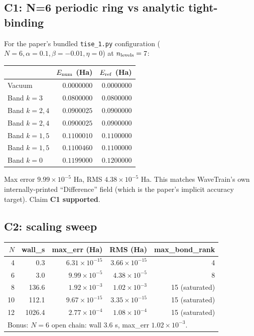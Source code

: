 \documentclass[11pt]{article}
\begin{document}
\subsection{C1: N=6 periodic ring vs analytic tight-binding}
For the paper's bundled \texttt{tise\_1.py} configuration
($N{=}6, \alpha{=}0.1, \beta{=}-0.01, \eta{=}0$) at $n_{\rm levels}=7$:
\begin{center}
\small
\begin{tabular}{l r r}
\toprule
& $E_{\rm num}$ (Ha) & $E_{\rm ref}$ (Ha) \\
\midrule
Vacuum   & $0.0000000$ & $0.0000000$ \\
Band $k{=}3$ & $0.0800000$ & $0.0800000$ \\
Band $k{=}2,4$ & $0.0900025$ & $0.0900000$ \\
Band $k{=}2,4$ & $0.0900025$ & $0.0900000$ \\
Band $k{=}1,5$ & $0.1100010$ & $0.1100000$ \\
Band $k{=}1,5$ & $0.1100460$ & $0.1100000$ \\
Band $k{=}0$ & $0.1199000$ & $0.1200000$ \\
\bottomrule
\end{tabular}
\end{center}
Max error $9.99 \times 10^{-5}$ Ha, RMS $4.38 \times 10^{-5}$ Ha.  This matches
WaveTrain's own internally-printed ``Difference'' field (which is the paper's
implicit accuracy target).  Claim \textbf{C1 supported}.

\subsection{C2: scaling sweep}
\begin{center}
\small
\begin{tabular}{r r r r r}
\toprule
$N$ & wall\_s & max\_err (Ha) & RMS (Ha) & max\_bond\_rank \\
\midrule
4  & 0.3    & $6.31\times 10^{-15}$ & $3.66\times 10^{-15}$ & 4  \\
6  & 3.0    & $9.99\times 10^{-5}$  & $4.38\times 10^{-5}$  & 8  \\
8  & 136.6  & $1.92\times 10^{-3}$  & $1.02\times 10^{-3}$  & 15 (saturated) \\
10 & 112.1  & $9.67\times 10^{-15}$ & $3.35\times 10^{-15}$ & 15 (saturated) \\
12 & 1026.4 & $2.77\times 10^{-4}$  & $1.08\times 10^{-4}$  & 15 (saturated) \\
\midrule
\multicolumn{5}{l}{Bonus: $N{=}6$ open chain: wall 3.6 s, max\_err $1.02\times 10^{-3}$.} \\
\bottomrule
\end{tabular}
\end{center}
\end{document}
